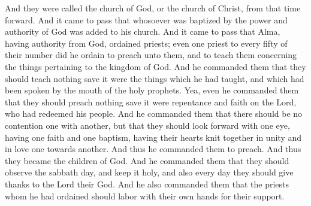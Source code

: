 And they were called the church of God, or the church of Christ, from that time forward. And it came to pass that whosoever was baptized by the power and authority of God was added to his church.
\bverse \iffalse And it came to pass that Alma, having authority from God, ordained priests; even one priest to every fifty of their number did he ordain to preach unto them, and to teach them concerning the things pertaining to the kingdom of God. \fi
And it came to pass that Alma, having authority from God, ordained priests; even one priest to every fifty of their number did he ordain to preach unto them, and to teach them concerning the things pertaining to the kingdom of God.
\bverse \iffalse And he commanded them that they should teach nothing save it were the things which he had taught, and which had been spoken by the mouth of the holy prophets. \fi
And he commanded them that they should teach nothing save it were the things which he had taught, and which had been spoken by the mouth of the holy prophets.
\bverse \iffalse Yea, even he commanded them that they should preach nothing save it were repentance and faith on the Lord, who had redeemed his people. \fi
Yea, even he commanded them that they should preach nothing save it were repentance and faith on the Lord, who had redeemed his people.
\bverse \iffalse And he commanded them that there should be no contention one with another, but that they should look forward with one eye, having one faith and one baptism, having their hearts knit together in unity and in love one towards another. \fi
And he commanded them that there should be no contention one with another, but that they should look forward with one eye, having one faith and one baptism, having their hearts knit together in unity and in love one towards another.
\bverse \iffalse And thus he commanded them to preach. And thus they became the children of God. \fi
And thus he commanded them to preach. And thus they became the children of God.
\bverse \iffalse And he commanded them that they should observe the sabbath day, and keep it holy, and also every day they should give thanks to the Lord their God. \fi
And he commanded them that they should observe the sabbath day, and keep it holy, and also every day they should give thanks to the Lord their God.
\bverse \iffalse And he also commanded them that the priests whom he had ordained should labor with their own hands for their support. \fi
And he also commanded them that the priests whom he had ordained should labor with their own hands for their support.
